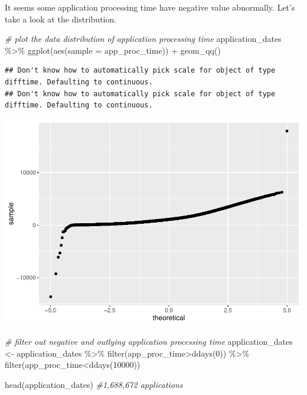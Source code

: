 \documentclass[
]{article}
\newenvironment{Shaded}{\begin{snugshade}}{\end{snugshade}}
\newcommand{\AttributeTok}[1]{\textcolor[rgb]{0.77,0.63,0.00}{#1}}
\newcommand{\CommentTok}[1]{\textcolor[rgb]{0.56,0.35,0.01}{\textit{#1}}}
\newcommand{\DecValTok}[1]{\textcolor[rgb]{0.00,0.00,0.81}{#1}}
\newcommand{\FunctionTok}[1]{\textcolor[rgb]{0.00,0.00,0.00}{#1}}
\newcommand{\NormalTok}[1]{#1}
\newcommand{\OtherTok}[1]{\textcolor[rgb]{0.56,0.35,0.01}{#1}}
\newcommand{\SpecialCharTok}[1]{\textcolor[rgb]{0.00,0.00,0.00}{#1}}
\begin{document}
It seems some application processing time have negative value
abnormally. Let's take a look at the distribution.

\begin{Shaded}
\begin{Highlighting}[]
\CommentTok{\# plot the data distribution of application processing time}
\NormalTok{application\_dates }\SpecialCharTok{\%\textgreater{}\%}
  \FunctionTok{ggplot}\NormalTok{(}\FunctionTok{aes}\NormalTok{(}\AttributeTok{sample =}\NormalTok{ app\_proc\_time)) }\SpecialCharTok{+}
  \FunctionTok{geom\_qq}\NormalTok{()}
\end{Highlighting}
\end{Shaded}

\begin{verbatim}
## Don't know how to automatically pick scale for object of type difftime. Defaulting to continuous.
## Don't know how to automatically pick scale for object of type difftime. Defaulting to continuous.
\end{verbatim}

\includegraphics{final_report_files/figure-latex/unnamed-chunk-3-1.pdf}

\begin{Shaded}
\begin{Highlighting}[]
\CommentTok{\# filter out negative and outlying application processing time}
\NormalTok{application\_dates }\OtherTok{\textless{}{-}}\NormalTok{ application\_dates }\SpecialCharTok{\%\textgreater{}\%} 
    \FunctionTok{filter}\NormalTok{(app\_proc\_time}\SpecialCharTok{\textgreater{}}\FunctionTok{ddays}\NormalTok{(}\DecValTok{0}\NormalTok{)) }\SpecialCharTok{\%\textgreater{}\%} 
    \FunctionTok{filter}\NormalTok{(app\_proc\_time}\SpecialCharTok{\textless{}}\FunctionTok{ddays}\NormalTok{(}\DecValTok{10000}\NormalTok{))}

\FunctionTok{head}\NormalTok{(application\_dates) }\CommentTok{\#1,688,672 applications}
\end{Highlighting}
\end{Shaded}
\end{document}
